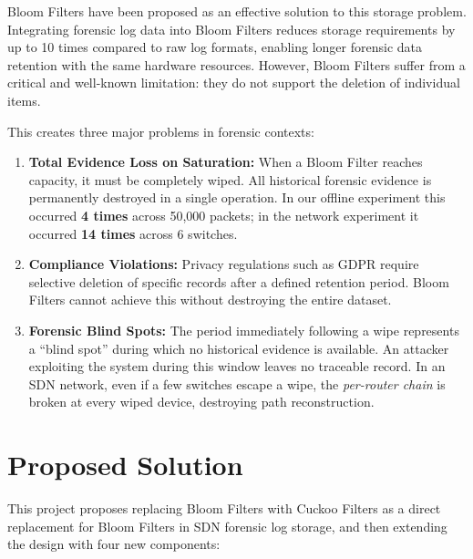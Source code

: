 \documentclass[12pt, a4paper]{report}
\begin{document}
Bloom Filters have been proposed as an effective solution to this storage
problem. Integrating forensic log data into Bloom Filters reduces storage
requirements by up to 10 times compared to raw log formats, enabling longer
forensic data retention with the same hardware resources. However, Bloom
Filters suffer from a critical and well-known limitation: they do not support
the deletion of individual items.

This creates three major problems in forensic contexts:

\begin{enumerate}[leftmargin=*, label=\textbf{\arabic*.}]

  \item \textbf{Total Evidence Loss on Saturation:}
  When a Bloom Filter reaches capacity, it must be completely wiped. All
  historical forensic evidence is permanently destroyed in a single
  operation. In our offline experiment this occurred \textbf{4 times}
  across 50,000 packets; in the network experiment it occurred
  \textbf{14 times} across 6 switches.

  \item \textbf{Compliance Violations:}
  Privacy regulations such as GDPR require selective deletion of specific
  records after a defined retention period. Bloom Filters cannot achieve
  this without destroying the entire dataset.

  \item \textbf{Forensic Blind Spots:}
  The period immediately following a wipe represents a ``blind spot'' during
  which no historical evidence is available. An attacker exploiting the
  system during this window leaves no traceable record. In an SDN network,
  even if a few switches escape a wipe, the \textit{per-router chain} is
  broken at every wiped device, destroying path reconstruction.

\end{enumerate}

\section{Proposed Solution}

This project proposes replacing Bloom Filters with Cuckoo Filters as a
direct replacement for Bloom Filters in SDN forensic log storage, and then
extending the design with four new components:
\end{document}
